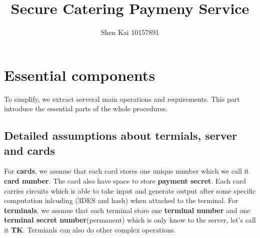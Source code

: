 \documentclass{article}
\title{Secure Catering Paymeny Service}
\author{Shen Kai 10157891}
\begin{document}
    \maketitle
    \section{Essential components}
To simplify, we extract serveral main operations and requirements. This part introduce the essential parts of the whole procedures.
        \subsection*{Detailed assumptions about termials, server and cards}
For \textbf{cards}, we assmue that each card stores one unique number which we call it \textbf{card number}. The card also have space to store \textbf{payment secret}. Each card carries  circuits which is able to take input and generate output after some specific computation inlcuding (3DES and hash) when attached to the terminal.
        \newline
For \textbf{terminals}, we assmue that each terminal store one \textbf{terminal number} and one \textbf{terminal secret number}(permanent) which is only know to the server, let's call it \textbf{TK}. Termianls can also do other complex operations.
\end{document}
